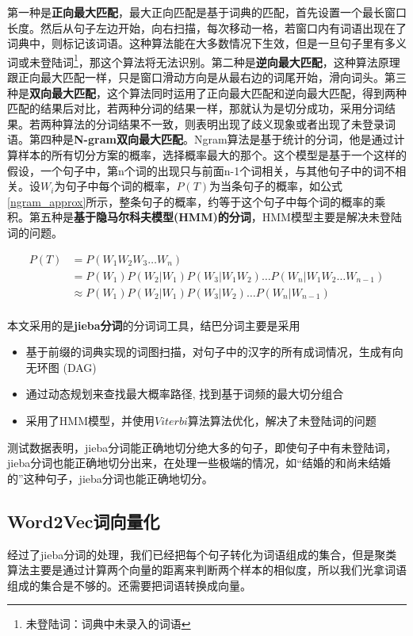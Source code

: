第一种是\textbf{正向最大匹配}，最大正向匹配是基于词典的匹配，首先设置一个最长窗口长度。然后从句子左边开始，向右扫描，每次移动一格，若窗口内有词语出现在了词典中，则标记该词语。这种算法能在大多数情况下生效，但是一旦句子里有多义词或未登陆词\footnote{\label{unlogin_word}未登陆词：词典中未录入的词语}，那这个算法将无法识别。第二种是\textbf{逆向最大匹配}，这种算法原理跟正向最大匹配一样，只是窗口滑动方向是从最右边的词尾开始，滑向词头。第三种是\textbf{双向最大匹配}，这个算法同时运用了正向最大匹配和逆向最大匹配，得到两种匹配的结果后对比，若两种分词的结果一样，那就认为是切分成功，采用分词结果。若两种算法的分词结果不一致，则表明出现了歧义现象或者出现了未登录词语。第四种是\textbf{N-gram双向最大匹配}。Ngram算法是基于统计的分词，他是通过计算样本的所有切分方案的概率，选择概率最大的那个。这个模型是基于一个这样的假设，一个句子中，第n个词的出现只与前面n-1个词相关，与其他句子中的词不相关。设$W_i$为句子中每个词的概率，$P \left( T \right)$为当条句子的概率，如公式\ref{ngram_approx}所示，整条句子的概率，约等于这个句子中每个词的概率的乘积。第五种是\textbf{基于隐马尔科夫模型(HMM)的分词}，HMM模型主要是解决未登陆词的问题。

\begin{equation}
	\begin{aligned}
		P(T) &= P(W_1W_2W_3…W_n) \\
				&= P(W_1)P(W_2|W_1)P(W_3|W_1W_2)…P(W_n|W_1W_2…W_{n-1}) \\
				&\approx P(W_1)P(W_2|W_1)P(W_3|W_2)…P(W_n|W_{n-1})\\
	\end{aligned}
\label{ngram_approx}
\end{equation}


本文采用的是\textbf{jieba分词}的分词词工具，结巴分词主要是采用
\begin{itemize}
	\item 基于前缀的词典实现的词图扫描，对句子中的汉字的所有成词情况，生成有向无环图 (DAG)
	\item 通过动态规划来查找最大概率路径, 找到基于词频的最大切分组合
	\item 采用了HMM模型，并使用$Viterbi$算法算法优化，解决了未登陆词的问题
\end{itemize}

测试数据表明，jieba分词能正确地切分绝大多的句子，即使句子中有未登陆词，jieba分词也能正确地切分出来，在处理一些极端的情况，如“结婚的和尚未结婚的”这种句子，jieba分词也能正确地切分。


\subsection{Word2Vec词向量化}
经过了jieba分词的处理，我们已经把每个句子转化为词语组成的集合，但是聚类算法主要是通过计算两个向量的距离来判断两个样本的相似度，所以我们光拿词语组成的集合是不够的。还需要把词语转换成向量。

